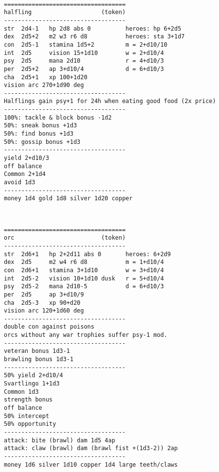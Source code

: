 \

\goodbreak \begin{samepage} \begin{verbatim}
===================================
halfling                    (token)
-----------------------------------
str  2d4-1   hp 2d8 abs 0          heroes: hp 6+2d5
dex  2d5+2   m2 w3 r6 d8           heroes: sta 3+1d7
con  2d5-1   stamina 1d5+2         m = 2+d10/10
int  2d5     vision 15+1d10        w = 2+d10/4
psy  2d5     mana 2d10             r = 4+d10/3
per  2d5+2   ap 3+d10/4            d = 6+d10/3
cha  2d5+1   xp 100+1d20
vision arc 270+1d90 deg
-----------------------------------
Halflings gain psy+1 for 24h when eating good food (2x price)
-----------------------------------
100%: tackle & block bonus -1d2
50%: sneak bonus +1d3
50%: find bonus +1d3
50%: gossip bonus +1d3
-----------------------------------
yield 2+d10/3
off balance
Common 2+1d4
avoid 1d3
-----------------------------------
money 1d4 gold 1d8 silver 1d20 copper
\end{verbatim} \end{samepage}

\

\goodbreak \begin{samepage} \begin{verbatim}
===================================
orc                         (token)
-----------------------------------
str  2d6+1   hp 2+2d11 abs 0       heroes: 6+2d9
dex  2d5     m2 w4 r6 d8           m = 1+d10/4
con  2d6+1   stamina 3+1d10        w = 3+d10/4
int  2d5-2   vision 10+1d10 dusk   r = 5+d10/4
psy  2d5-2   mana 2d10-5           d = 6+d10/3
per  2d5     ap 3+d10/9
cha  2d5-3   xp 90+d20
vision arc 120+1d60 deg
-----------------------------------
double con against poisons
orcs without any war trophies suffer psy-1 mod.
-----------------------------------
veteran bonus 1d3-1
brawling bonus 1d3-1
-----------------------------------
50% yield 2+d10/4
Svartlingo 1+1d3
Common 1d3
strength bonus
off balance
50% intercept
50% opportunity
-----------------------------------
attack: bite (brawl) dam 1d5 4ap
attack: claw (brawl) dam (brawl fist +(1d3-2)) 2ap
-----------------------------------
money 1d6 silver 1d10 copper 1d4 large teeth/claws
\end{verbatim} \end{samepage}

\

